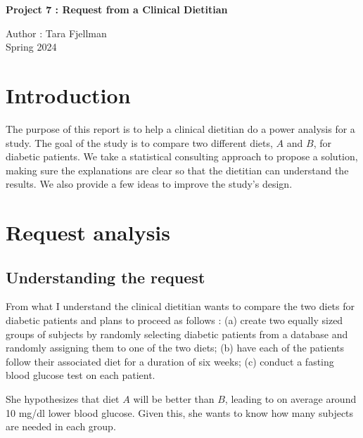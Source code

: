 \documentclass[a4paper, 12pt,oneside]{article}
\begin{document}
 
	\begin{center}
	    \Large
	    \textbf{Project 7 : Request from a Clinical Dietitian}
	    \vspace{0.4cm}
	    \large
        
	    Author : Tara Fjellman \\
	    \small{Spring 2024}
	\end{center}
	\section{Introduction}
	The purpose of this report is to help a clinical dietitian do a power analysis for a study. The goal of the study is to compare two different diets, $A$ and $B$, for diabetic patients. We take a statistical consulting approach to propose a solution, making sure the explanations are clear so that the dietitian can understand the results. We also provide a few ideas to improve the study's design.
    \section{Request analysis}
	\subsection{Understanding the request}
	From what I understand the clinical dietitian wants to compare the two diets for diabetic patients and plans to proceed as follows : (a) create two equally sized groups of subjects by randomly selecting diabetic patients from a database and randomly assigning them to one of the two diets; (b) have each of the patients follow their associated diet for a duration of six weeks; (c) conduct a fasting blood glucose test on each patient.

	She hypothesizes that diet $A$ will be better than $B$, leading to on average around 10 mg/dl lower blood glucose. Given this, she wants to know how many subjects are needed in each group. 
\end{document}
